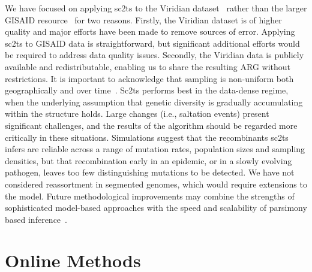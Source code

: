 \documentclass[12pt]{article}
\begin{document}
We have focused on applying sc2ts to the Viridian dataset~\cite{Hunt2026} rather
than the larger GISAID resource~\cite{Shu2017} for two reasons.
Firstly, the Viridian dataset is of higher quality and major efforts
have been made to remove sources of error. Applying sc2ts to
GISAID data is straightforward, but significant additional efforts
would be required to address data quality issues.
Secondly, the Viridian data is publicly available and redistributable,
enabling us to share the resulting ARG without restrictions.
It is important to acknowledge that sampling is non-uniform both
geographically and over time~\cite{Lancet2021,Chen2022}.
Sc2ts performs best in the data-dense regime, when the underlying
assumption that genetic diversity is gradually accumulating within
the structure holds. Large changes (i.e., saltation events) present
significant challenges, and the results of the algorithm should
be regarded more critically in these situations.
Simulations suggest that the recombinants sc2ts infers are reliable
across a range of mutation rates, population sizes and sampling densities,
but that recombination early in an epidemic, or in a slowly evolving pathogen,
leaves too few distinguishing mutations to be detected.
We have not considered reassortment in segmented genomes,
which would require extensions to the model.
Future methodological improvements may combine the strengths
of sophisticated model-based approaches with the
speed and scalability of parsimony based
inference~\cite{Bisschop2025likelihoods}.

\clearpage %

\section*{Online Methods}
\end{document}
